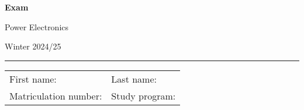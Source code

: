 \begin{center}

    {\vspace{3mm}\Large \textbf{
    \textsf{Exam}}
    \vspace{3mm}
    
    \LARGE
    \textsf{Power Electronics}
    
    \vspace{6mm}
    \large
    
    Winter 2024/25
    \vspace{5mm}
    }
    
    
\end{center}
    
    \hrule
    
    
    \vspace{5mm}
    
\begin{flushleft}
\begin{tabular}{ll}
    First name:  \qquad \qquad \qquad  \qquad \qquad\qquad \qquad \qquad & Last name: \\[1cm]
     Matriculation number: & Study program:
\end{tabular}
\end{flushleft}


